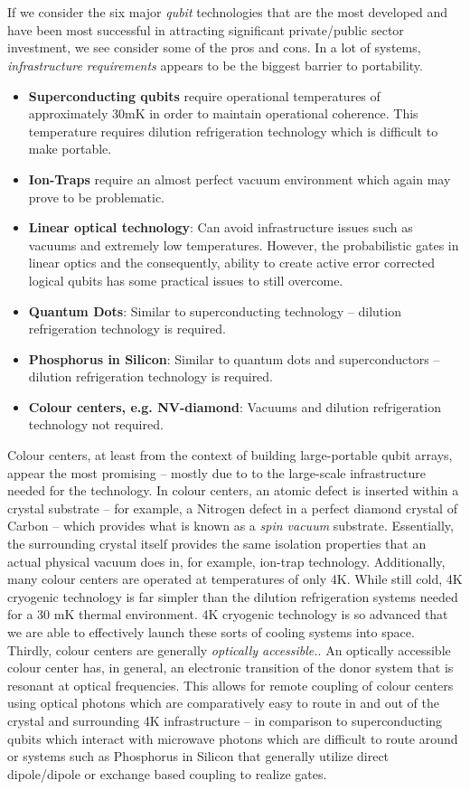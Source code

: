 \documentclass[aps,prl,twocolumn,10pt,nofootinbib]{revtex4}
\begin{document}
\\
\\
If we consider the six major {\em qubit} technologies that are the most developed and have been most successful in attracting significant private/public sector investment, we see consider some of the pros and cons.  In a lot of systems, {\em infrastructure requirements} appears to be the biggest barrier to portability.  
\begin{itemize}
\item {\bf Superconducting qubits} require operational temperatures of approximately 30mK in order to maintain operational coherence.  This temperature requires dilution refrigeration technology which is difficult to make portable.  
\item {\bf Ion-Traps} require an almost perfect vacuum environment which again may prove to be problematic. 
\item {\bf Linear optical technology}: Can avoid infrastructure issues such as vacuums and extremely low temperatures.  However, the probabilistic gates in linear optics and the consequently, ability to create active error corrected logical qubits has some practical issues to still overcome.    
\item {\bf Quantum Dots}: Similar to superconducting technology -- dilution refrigeration technology is required.
\item {\bf Phosphorus in Silicon}: Similar to quantum dots and superconductors -- dilution refrigeration technology is required. 
\item {\bf Colour centers, e.g. NV-diamond}:  Vacuums and dilution refrigeration technology not required.  
\end{itemize}

Colour centers, at least from the context of building large-portable qubit arrays, appear the most promising -- mostly due to to the large-scale infrastructure needed for the technology.  In colour centers, an atomic defect is inserted within a crystal substrate -- for example, a Nitrogen defect in a perfect diamond crystal of Carbon -- which provides what is known as a {\em spin vacuum} substrate.  Essentially, the surrounding crystal itself provides the same isolation properties that an actual physical vacuum does in, for example, ion-trap technology.  Additionally, many colour centers are operated at temperatures of only 4K.  While still cold, 4K cryogenic technology is far simpler than the dilution refrigeration systems needed for a 30 mK thermal environment.  4K cryogenic technology is so advanced that we are able to effectively launch these sorts of cooling systems into space.  Thirdly, colour centers are generally {\em optically accessible.}.  An optically accessible colour center has, in general, an electronic transition of the donor system that is resonant at optical frequencies.  This allows for remote coupling of colour centers using optical photons which are comparatively easy to route in and out of the crystal and surrounding 4K infrastructure -- in comparison to superconducting qubits which interact with microwave photons which are difficult to route around or systems such as Phosphorus in Silicon that generally utilize direct dipole/dipole or exchange based coupling to realize gates.  
\end{document}
